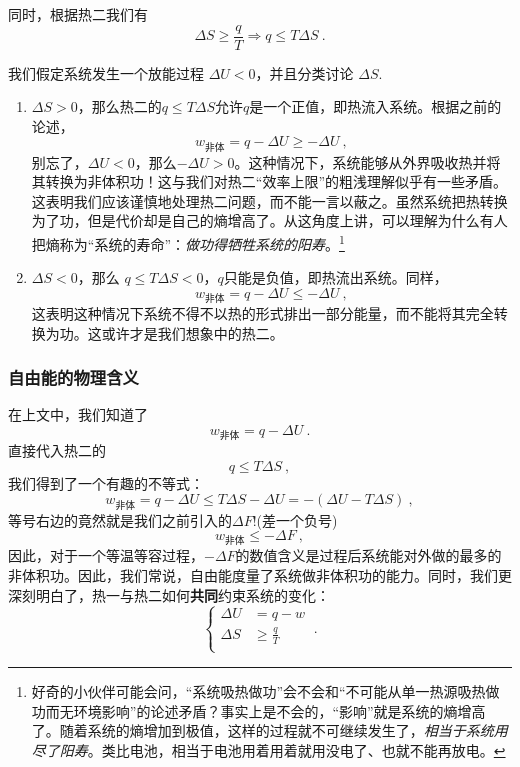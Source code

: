 同时，根据热二我们有
$$
\Delta S \ge \frac{q}{T} \Rightarrow q \le T \Delta S~.
$$

我们假定系统发生一个放能过程 $\Delta U < 0$，并且分类讨论 $\Delta S$.
\begin{enumerate}
\item $\Delta S > 0$，那么热二的$q \le T\Delta S$允许$q$是一个正值，即热流入系统。根据之前的论述，
$$
w_\text{非体} = q - \Delta U \ge - \Delta U 
~,
$$
别忘了，$\Delta U<0$，那么$-\Delta U>0$。这种情况下，系统能够从外界吸收热并将其转换为非体积功！这与我们对热二“效率上限”的粗浅理解似乎有一些矛盾。这表明我们应该谨慎地处理热二问题，而不能一言以蔽之。虽然系统把热转换为了功，但是代价却是自己的熵增高了。从这角度上讲，可以理解为什么有人把熵称为“系统的寿命”：\textsl{做功得牺牲系统的阳寿}。\footnote{好奇的小伙伴可能会问，“系统吸热做功”会不会和“不可能从单一热源吸热做功而无环境影响”的论述矛盾？事实上是不会的，“影响”就是系统的熵增高了。随着系统的熵增加到极值，这样的过程就不可继续发生了，\textsl{相当于系统用尽了阳寿}。类比电池，相当于电池用着用着就用没电了、也就不能再放电。}
\item $\Delta S < 0$，那么 $q \le T\Delta S < 0$，$q$只能是负值，即热流出系统。同样，
$$
w_\text{非体} = q - \Delta U \le - \Delta U 
~,
$$
这表明这种情况下系统不得不以热的形式排出一部分能量，而不能将其完全转换为功。这或许才是我们想象中的热二。
\end{enumerate}

\subsubsection{自由能的物理含义}
在上文中，我们知道了
$$ w_{\text{非体}} = q - \Delta U~.$$
直接代入热二的
$$
q \le T\Delta S
~,
$$
我们得到了一个有趣的不等式：
$$
w_{\text{非体}} = q - \Delta U \le T \Delta S - \Delta U = - (\Delta U-T \Delta S ) ~,
$$
等号右边的竟然就是我们之前引入的$\Delta F$!(差一个负号) 
\begin{equation}
w_\text{非体} \le - \Delta F~,
\end{equation}
因此，对于一个等温等容过程，$-\Delta F$的数值含义是过程后系统能对外做的最多的非体积功。因此，我们常说，自由能度量了系统做非体积功的能力。同时，我们更深刻明白了，热一与热二如何\textbf{共同}约束系统的变化：
\begin{equation}
\left \{
    \begin{aligned}
    \Delta U &= q-w\\
    \Delta S &\ge \frac{q}{T}\\
    \end{aligned}
\right.~.
\end{equation}


